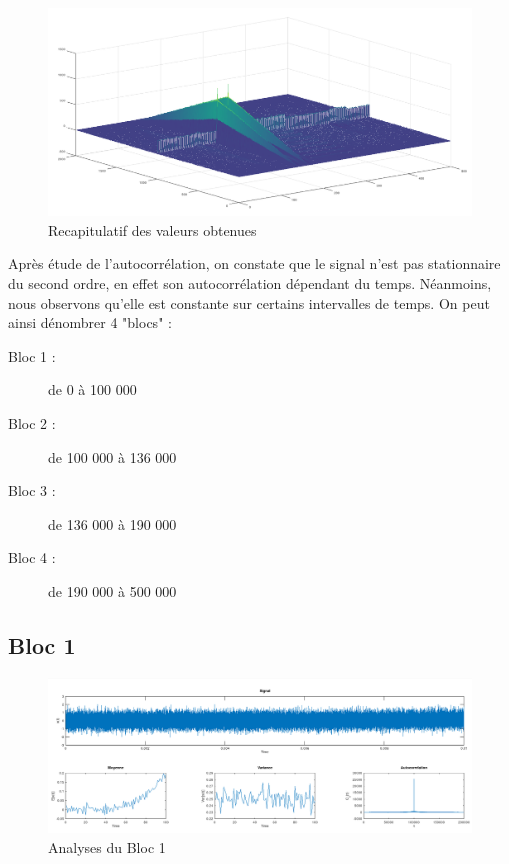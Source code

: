 \documentclass[french, a4paper, 12pt, openany]{book}
\begin{document}
	\begin{figure}[ht]
		\begin{center}
		\includegraphics[scale=0.25]{images/AutoCorrFull.png}
		\end{center}
		\caption{Recapitulatif des valeurs obtenues}
		\label{Recapitulatif des valeurs obtenues}
	\end{figure}

	Après étude de l'autocorrélation, on constate que le signal n'est pas stationnaire du second ordre, en effet son autocorrélation dépendant du temps. Néanmoins, nous observons qu'elle est constante sur certains intervalles de temps. On peut ainsi dénombrer 4 "blocs" :

  \begin{description}
    \item[Bloc 1 : ]de 0 à 100 000
    \item[Bloc 2 : ]de 100 000 à 136 000
    \item[Bloc 3 : ]de 136 000 à 190 000
    \item[Bloc 4 : ]de 190 000 à 500 000
  \end{description}
  \subsection{Bloc 1}
	\begin{figure}[ht]
    \begin{center}
    \includegraphics[scale=0.25]{images/SignalBloc1.png}
    \end{center}
    \caption{Analyses du Bloc 1}
    \label{Analyses du Bloc 1}
  \end{figure}
\end{document}
